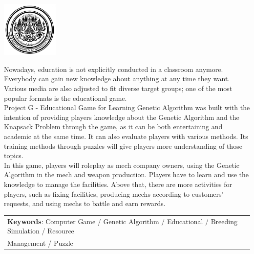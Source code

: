 \documentclass[12pt,oneside,openright,a4paper]{cpe-english-project}
\begin{document}
\pdfstringdefDisableCommands{%
\let\MakeUppercase\relax
}
\begin{center}
  \includegraphics[width=2.8cm]{logo02.png}
\end{center}
\vspace*{-1cm}

\maketitlepage
\makesignaturepage 

\abstract

Nowadays, education is not explicitly conducted in a classroom anymore. Everybody can gain new knowledge about anything at any time they want. Various media are also adjusted to fit diverse target groups; one of the most popular formats is the educational game. \\
Project G - Educational Game for Learning Genetic Algorithm was built with the intention of providing players knowledge about the Genetic Algorithm and the Knapsack Problem through the game, as it can be both entertaining and academic at the same time. It can also evaluate players with various methods. Its training methods through puzzles will give players more understanding of those topics. \\
In this game, players will roleplay as mech company owners, using the Genetic Algorithm in the mech and weapon production. Players have to learn and use the knowledge to manage the facilities. Above that, there are more activities for players, such as fixing facilities, producing mechs according to customers’ requests, and using mechs to battle and earn rewards.


\begin{flushleft}
\begin{tabular*}{\textwidth}{@{}lp{}}
\textbf{Keywords}:  Computer Game / Genetic Algorithm / Educational / Breeding Simulation / Resource \\Management / Puzzle
\end{tabular*}
\end{flushleft}
\endabstract
\end{document}
